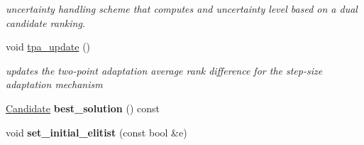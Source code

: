 \begin{DoxyCompactItemize}
\begin{DoxyCompactList}\small\item\em uncertainty handling scheme that computes and uncertainty level based on a dual candidate ranking. \end{DoxyCompactList}\item 
\hypertarget{classlibcmaes_1_1ESOStrategy_a68254de1be47abf4ec22e4692e5aeb32}{void \hyperlink{classlibcmaes_1_1ESOStrategy_a68254de1be47abf4ec22e4692e5aeb32}{tpa\+\_\+update} ()}\label{classlibcmaes_1_1ESOStrategy_a68254de1be47abf4ec22e4692e5aeb32}

\begin{DoxyCompactList}\small\item\em updates the two-\/point adaptation average rank difference for the step-\/size adaptation mechanism \end{DoxyCompactList}\item 
\hypertarget{classlibcmaes_1_1ESOStrategy_a81441905608aba3daa6d60a78eb47763}{\hyperlink{classlibcmaes_1_1Candidate}{Candidate} {\bfseries best\+\_\+solution} () const }\label{classlibcmaes_1_1ESOStrategy_a81441905608aba3daa6d60a78eb47763}

\item 
\hypertarget{classlibcmaes_1_1ESOStrategy_a059cdb2676a9e9933ac8b9dad32a1938}{void {\bfseries set\+\_\+initial\+\_\+elitist} (const bool \&e)}\label{classlibcmaes_1_1ESOStrategy_a059cdb2676a9e9933ac8b9dad32a1938}

\end{DoxyCompactItemize}
